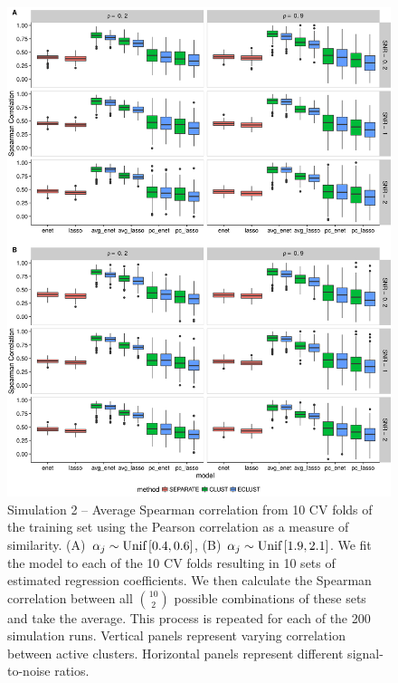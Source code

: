 \begin{appendices}
\begin{figure}[H]
	\centering
	\includegraphics[scale=0.55, keepaspectratio]{./figs/hydra/results/figures/sim2-sept8/spearman_Correlation_sim2.png}
	\caption{Simulation 2 -- Average Spearman correlation from 10 CV folds of the training set using the Pearson correlation as a measure of similarity. \mbox{(A) $\alpha_{j} \sim \textrm{{Unif}}\left[0.4, 0.6\right]$}, \mbox{(B) $\alpha_{j} \sim \textrm{{Unif}}\left[1.9, 2.1\right]$}. We fit the model to each of the 10 CV folds resulting in 10 sets of estimated regression coefficients. We then calculate the Spearman correlation between all $\binom{10}{2}$ possible combinations of these sets and take the average. This process is repeated for each of the 200 simulation runs. Vertical panels represent varying correlation between active clusters. Horizontal panels represent different signal-to-noise ratios.}
	\label{fig:spearman_Correlation_sim2}
\end{figure}


\end{appendices}

